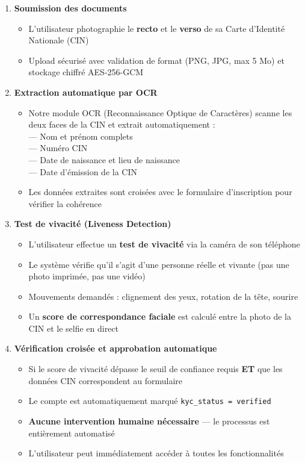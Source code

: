 \documentclass[11pt,a4paper]{article}
\begin{document}
\begin{enumerate}[leftmargin=*]
    \item \textbf{Soumission des documents}
    \begin{itemize}
        \item L'utilisateur photographie le \textbf{recto} et le \textbf{verso} de sa Carte d'Identit\'e Nationale (CIN)
        \item Upload s\'ecuris\'e avec validation de format (PNG, JPG, max 5 Mo) et stockage chiffr\'e AES-256-GCM
    \end{itemize}

    \item \textbf{Extraction automatique par OCR}
    \begin{itemize}
        \item Notre module OCR (Reconnaissance Optique de Caract\`eres) scanne les deux faces de la CIN et extrait automatiquement :\\
        --- Nom et pr\'enom complets\\
        --- Num\'ero CIN\\
        --- Date de naissance et lieu de naissance\\
        --- Date d'\'emission de la CIN
        \item Les donn\'ees extraites sont crois\'ees avec le formulaire d'inscription pour v\'erifier la coh\'erence
    \end{itemize}

    \item \textbf{Test de vivacit\'e (Liveness Detection)}
    \begin{itemize}
        \item L'utilisateur effectue un \textbf{test de vivacit\'e} via la cam\'era de son t\'el\'ephone
        \item Le syst\`eme v\'erifie qu'il s'agit d'une personne r\'eelle et vivante (pas une photo imprim\'ee, pas une vid\'eo)
        \item Mouvements demand\'es : clignement des yeux, rotation de la t\^ete, sourire
        \item Un \textbf{score de correspondance faciale} est calcul\'e entre la photo de la CIN et le selfie en direct
    \end{itemize}

    \item \textbf{V\'erification crois\'ee et approbation automatique}
    \begin{itemize}
        \item Si le score de vivacit\'e d\'epasse le seuil de confiance requis \textbf{ET} que les donn\'ees CIN correspondent au formulaire
        \item Le compte est automatiquement marqu\'e \texttt{kyc\_status = verified}
        \item \textbf{Aucune intervention humaine n\'ecessaire} --- le processus est enti\`erement automatis\'e
        \item L'utilisateur peut imm\'ediatement acc\'eder \`a toutes les fonctionnalit\'es
    \end{itemize}
\end{enumerate}
\end{document}
